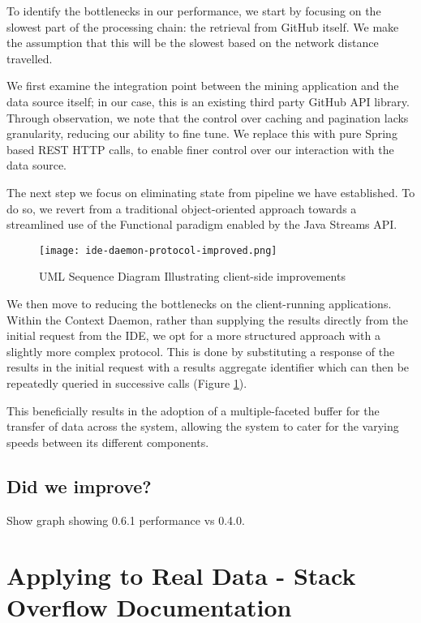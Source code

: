 To identify the bottlenecks in our performance, we start by focusing on the slowest part of the processing chain: the retrieval from GitHub itself. We make the assumption that this will be the slowest based on the network distance travelled.

We first examine the integration point between the mining application and the data source itself; in our case, this is an existing third party GitHub API library. Through observation, we note that the control over caching and pagination lacks granularity, reducing our ability to fine tune. We replace this with pure Spring based REST HTTP calls, to enable finer control over our interaction with the data source.

The next step we focus on eliminating state from pipeline we have established. To do so, we revert from a traditional object-oriented approach towards a streamlined use of the Functional paradigm enabled by the Java Streams API.


\begin{figure}[h!]
	\centering
	\texttt{[image: ide-daemon-protocol-improved.png]}
	\caption{UML Sequence Diagram Illustrating client-side improvements}
	\label{fig:ideDaemonProtocolImproved}
\end{figure}

We then move to reducing the bottlenecks on the client-running applications. Within the Context Daemon, rather than supplying the results directly from the initial request from the IDE, we opt for a more structured approach with a slightly more complex protocol. This is done by substituting a response of the results in the initial request with a results aggregate identifier which can then be repeatedly queried in successive calls (Figure \ref{fig:ideDaemonProtocolImproved}).

This beneficially results in the adoption of a multiple-faceted buffer for the transfer of data across the system, allowing the system to cater for the varying speeds between its different components.

\subsection{Did we improve?}

Show graph showing 0.6.1 performance vs 0.4.0.

\section{Applying to Real Data - Stack Overflow Documentation}

